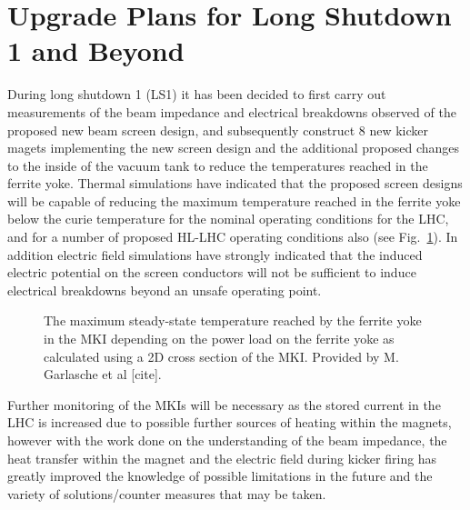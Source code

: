 \section{Upgrade Plans for Long Shutdown 1 and Beyond}

During long shutdown 1 (LS1) it has been decided to first carry out measurements of the beam impedance and electrical breakdowns observed of the proposed new beam screen design, and subsequently construct 8 new kicker magets implementing the new screen design and the additional proposed changes to the inside of the vacuum tank to reduce the temperatures reached in the ferrite yoke. Thermal simulations have indicated that the proposed screen designs will be capable of reducing the maximum temperature reached in the ferrite yoke below the curie temperature for the nominal operating conditions for the LHC, and for a number of proposed HL-LHC operating conditions also (see Fig.~\ref{fig:pow-loss-stable-temp-mkis}). In addition electric field simulations have strongly indicated that the induced electric potential on the screen conductors will not be sufficient to induce electrical breakdowns beyond an unsafe operating point. 


\begin{figure}
\label{fig:pow-loss-stable-temp-mkis}
\caption{The maximum steady-state temperature reached by the ferrite yoke in the MKI depending on the power load on the ferrite yoke as calculated using a 2D cross section of the MKI. Provided by M. Garlasche et al [cite].}
\end{figure} 

Further monitoring of the MKIs will be necessary as the stored current in the LHC is increased due to possible further sources of heating within the magnets, however with the work done on the understanding of the beam impedance, the heat transfer within the magnet and the electric field during kicker firing has greatly improved the knowledge of possible limitations in the future and the variety of solutions/counter measures that may be taken. 